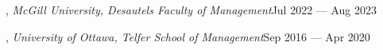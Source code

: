 , \textit{McGill University, Desautels Faculty of Management}\hfill Jul 2022 --- Aug 2023
\vspace{0.3em}

, \textit{University of Ottawa, Telfer School of Management}\hfill Sep 2016 --- Apr 2020
\vspace{0.5em}



